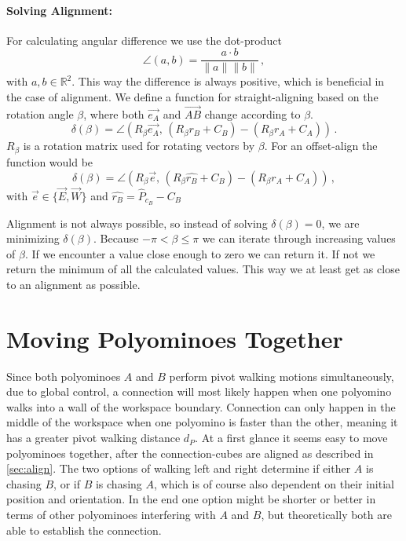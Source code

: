 \paragraph{Solving Alignment:}

For calculating angular difference we use the dot-product
\begin{equation*}
\angle (a,b) = \frac{a \cdot b}{\lVert a \rVert \lVert b \rVert} \,,
\end{equation*}
with $a,b \in \mathbb{R}^2$. This way the difference is always positive, which is beneficial in the case of alignment.
We define a function for straight-aligning based on the rotation angle $\beta$, where both $\vec{e_A}$ and $\overrightarrow{AB}$ change according to $\beta$.
\begin{equation}
\delta(\beta) = \angle \left( R_\beta \vec{e_A}, \, \left( R_\beta r_B + C_B \right) - \left( R_\beta r_A + C_A \right)\right) \,.
\end{equation}
$R_\beta$ is a rotation matrix used for rotating vectors by $\beta$.
For an offset-align the function would be
\begin{equation}
\delta(\beta) = \angle \left( R_\beta \vec{e}, \, \left( R_\beta \hat{r_B} + C_B \right) - \left( R_\beta r_A + C_A \right)\right) \,,
\end{equation}
with $\vec{e} \in \{ \vec{E}, \vec{W}\}$ and $\hat{r_B} = \hat{P}_{c_B} - C_B$

Alignment is not always possible, so instead of solving $\delta(\beta) = 0$, we are minimizing $\delta(\beta)$.
Because $-\pi < \beta \leq \pi$ we can iterate through increasing values of $\beta$.
If we encounter a value close enough to zero we can return it.
If not we return the minimum of all the calculated values.
This way we at least get as close to an alignment as possible.


\section{Moving Polyominoes Together}
\label{sec:walk_wait}

Since both polyominoes $A$ and $B$ perform pivot walking motions simultaneously, due to global control, a connection will most likely happen when one polyomino walks into a wall of the workspace boundary.
Connection can only happen in the middle of the workspace when one polyomino is faster than the other, meaning it has a greater pivot walking distance $d_P$.
At a first glance it seems easy to move polyominoes together, after the connection-cubes are aligned as described in \autoref{sec:align}.
The two options of walking left and right determine if either $A$ is chasing $B$, or if $B$ is chasing $A$, which is of course also dependent on their initial position and orientation.
In the end one option might be shorter or better in terms of other polyominoes interfering with $A$ and $B$, but theoretically both are able to establish the connection.

